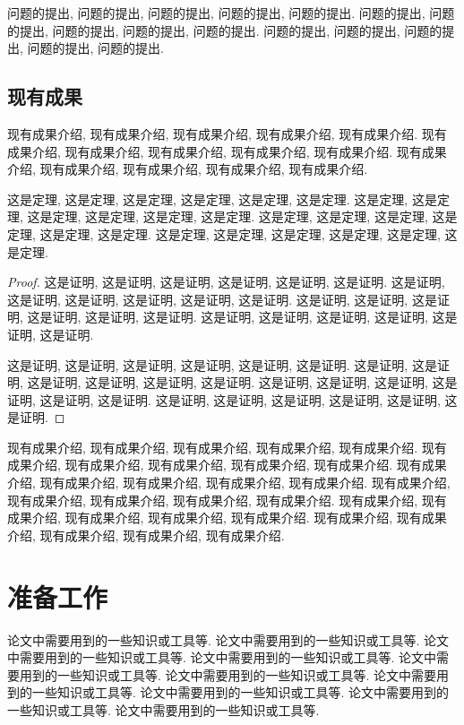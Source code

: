 \documentclass[UTF8,openright]{ctexbook}
\begin{document}
问题的提出, 问题的提出, 问题的提出, 问题的提出, 问题的提出.
问题的提出, 问题的提出, 问题的提出, 问题的提出, 问题的提出.
问题的提出, 问题的提出, 问题的提出, 问题的提出, 问题的提出.

\section{现有成果}
现有成果介绍, 现有成果介绍, 现有成果介绍, 现有成果介绍, 现有成果介绍.
现有成果介绍, 现有成果介绍, 现有成果介绍, 现有成果介绍, 现有成果介绍.
现有成果介绍, 现有成果介绍, 现有成果介绍, 现有成果介绍, 现有成果介绍.

\begin{theorem}
  这是定理, 这是定理, 这是定理, 这是定理, 这是定理, 这是定理.
  这是定理, 这是定理, 这是定理, 这是定理, 这是定理, 这是定理.
  这是定理, 这是定理, 这是定理, 这是定理, 这是定理, 这是定理.
  这是定理, 这是定理, 这是定理, 这是定理, 这是定理, 这是定理.
\end{theorem}
\begin{proof}
  这是证明, 这是证明, 这是证明, 这是证明, 这是证明, 这是证明.
  这是证明, 这是证明, 这是证明, 这是证明, 这是证明, 这是证明.
  这是证明, 这是证明, 这是证明, 这是证明, 这是证明, 这是证明.
  这是证明, 这是证明, 这是证明, 这是证明, 这是证明, 这是证明.

  这是证明, 这是证明, 这是证明, 这是证明, 这是证明, 这是证明.
  这是证明, 这是证明, 这是证明, 这是证明, 这是证明, 这是证明.
  这是证明, 这是证明, 这是证明, 这是证明, 这是证明, 这是证明.
  这是证明, 这是证明, 这是证明, 这是证明, 这是证明, 这是证明.
\end{proof}

现有成果介绍, 现有成果介绍, 现有成果介绍, 现有成果介绍, 现有成果介绍.
现有成果介绍, 现有成果介绍, 现有成果介绍, 现有成果介绍, 现有成果介绍.
现有成果介绍, 现有成果介绍, 现有成果介绍, 现有成果介绍, 现有成果介绍.
现有成果介绍, 现有成果介绍, 现有成果介绍, 现有成果介绍, 现有成果介绍.
现有成果介绍, 现有成果介绍, 现有成果介绍, 现有成果介绍, 现有成果介绍.
现有成果介绍, 现有成果介绍, 现有成果介绍, 现有成果介绍, 现有成果介绍.

\chapter{准备工作}

论文中需要用到的一些知识或工具等. 论文中需要用到的一些知识或工具等.
论文中需要用到的一些知识或工具等. 论文中需要用到的一些知识或工具等.
论文中需要用到的一些知识或工具等. 论文中需要用到的一些知识或工具等.
论文中需要用到的一些知识或工具等. 论文中需要用到的一些知识或工具等.
论文中需要用到的一些知识或工具等. 论文中需要用到的一些知识或工具等.
\end{document}
